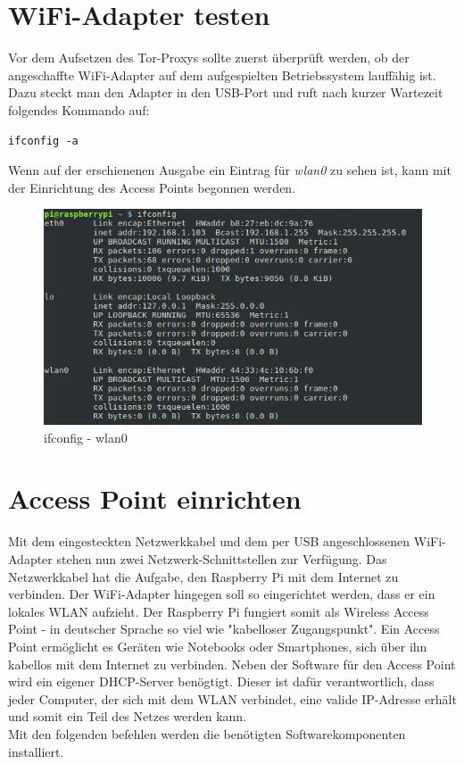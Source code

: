 \section{WiFi-Adapter testen}
Vor dem Aufsetzen des Tor-Proxys sollte zuerst überprüft werden, ob der angeschaffte WiFi-Adapter auf dem aufgespielten Betriebssystem lauffähig ist. Dazu steckt man den Adapter in den USB-Port und ruft nach kurzer Wartezeit folgendes Kommando auf:

\begin{lstlisting}
ifconfig -a
\end{lstlisting}

Wenn auf der erschienenen Ausgabe ein Eintrag für \textit{wlan0} zu sehen ist, kann mit der Einrichtung des Access Points begonnen werden.

\begin{figure}[h]
\centering
\includegraphics[scale=0.7]{images/ifconfig}
\caption{ifconfig - wlan0}
\end{figure}

\section{Access Point einrichten}
Mit dem eingesteckten Netzwerkkabel und dem per USB angeschlossenen WiFi-Adapter stehen nun zwei Netzwerk-Schnittstellen zur Verfügung. Das Netzwerkkabel hat die Aufgabe, den Raspberry Pi mit dem Internet zu verbinden. Der WiFi-Adapter hingegen soll so eingerichtet werden, dass er ein lokales WLAN aufzieht. Der Raspberry Pi fungiert somit als Wireless Access Point - in deutscher Sprache so viel wie "kabelloser Zugangspunkt". Ein Access Point ermöglicht es Geräten wie Notebooks oder Smartphones, sich über ihn kabellos mit dem Internet zu verbinden. Neben der Software für den Access Point wird ein eigener DHCP-Server benögtigt. Dieser ist dafür verantwortlich, dass jeder Computer, der sich mit dem WLAN verbindet, eine valide IP-Adresse erhält und somit ein Teil des Netzes werden kann.
\\
Mit den folgenden befehlen werden die benötigten Softwarekomponenten installiert.
 
